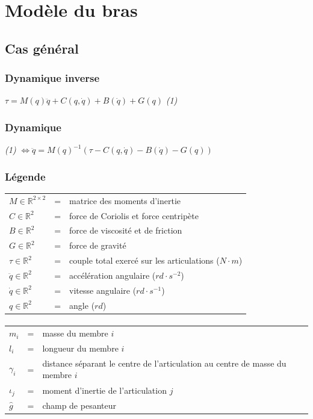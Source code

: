 \documentclass[pdftex,a4paper,11pt]{article}
\begin{document}

\section{Modèle du bras}


\subsection{Cas général}

\subsubsection{Dynamique inverse}
$\tau = M(q)\ddot{q} + C(q, \dot{q}) + B(\dot{q}) + G(q) $ \emph{(1)}

\subsubsection{Dynamique}
\emph{(1)} $\Leftrightarrow \ddot{q} = M(q)^{-1} (\tau - C(q, \dot{q}) - B(\dot{q}) - G(q)) $

\subsubsection{Légende}
\begin{tabular}{lcl}
    $M \in \mathbb{R}^{2 \times 2}$  & = & matrice des moments d'inertie \\ %
    $C \in \mathbb{R}^{2}$  & = & force de Coriolis et force centripète \\
    $B \in \mathbb{R}^{2}$  & = & force de viscosité et de friction \\ %
    $G \in \mathbb{R}^{2}$  & = & force de gravité \\
    $\tau \in \mathbb{R}^{2}$        & = & couple total exercé sur les articulations ($N \cdot m$) \\
    $\ddot{q} \in \mathbb{R}^{2}$    & = & accélération angulaire ($rd \cdot s^{-2}$) \\
    $\dot{q} \in \mathbb{R}^{2}$     & = & vitesse angulaire ($rd \cdot s^{-1}$)\\
    $q \in \mathbb{R}^{2}$           & = & angle ($rd$)\\
\end{tabular}

\paragraph{}
\begin{tabular}{lcl}
    $m_i$ & = & masse du membre $i$ \\
    $l_i$ & = & longueur du membre $i$ \\
    $\gamma_i$ & = & distance séparant le centre de l'articulation au centre de masse du membre $i$ \\
    $\iota_j$ & = & moment d'inertie de l'articulation $j$ \\
    $\hat{g}$ & = & champ de pesanteur \\
\end{tabular}
\end{document}
